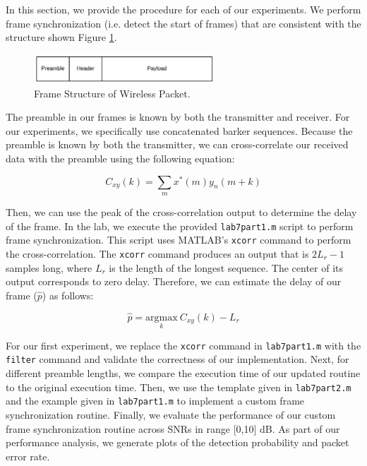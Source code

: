 \documentclass{article}
\begin{document}
In this section, we provide the procedure for each of our experiments. We perform frame synchronization (i.e. detect the start of frames) that are consistent with the structure shown Figure \ref{fig::frame_structure}.

\begin{figure}[H]
	\centerline{\includegraphics[width=0.6\textwidth]{frame_structure.png}}
	\caption{Frame Structure of Wireless Packet.}
	\label{fig::frame_structure}
\end{figure}

\noindent The preamble in our frames is known by both the transmitter and receiver. For our experiments, we specifically use concatenated barker sequences. Because the preamble is known by both the transmitter, we can cross-correlate our received data with the preamble using the following equation:

\begin{equation}
	C_{xy}(k) = \sum_{m}{x^*(m)y_n(m+k)}
\end{equation}

\noindent Then, we can use the peak of the cross-correlation output to determine the delay of the frame. In the lab, we execute the provided \texttt{lab7part1.m} script to perform frame synchronization. This script uses MATLAB's \texttt{xcorr} command to perform the cross-correlation. The \texttt{xcorr} command produces an output that is $2L_r - 1$ samples long, where $L_r$ is the length of the longest sequence. The center of its output corresponds to zero delay. Therefore, we can estimate the delay of our frame ($\hat{p}$) as follows:

\begin{equation}
	\hat{p} = \underset{k}{\text{argmax}}\ C_{xy}(k) - L_r
\end{equation}

\noindent For our first experiment, we replace the \texttt{xcorr} command in \texttt{lab7part1.m} with the \texttt{filter} command and validate the correctness of our implementation. Next, for different preamble lengths, we compare the execution time of our updated routine to the original execution time. Then, we use the template given in \texttt{lab7part2.m} and the example given in \texttt{lab7part1.m} to implement a custom frame synchronization routine. Finally, we evaluate the performance of our custom frame synchronization routine across SNRs in range [0,10] dB. As part of our performance analysis, we generate plots of the detection probability and packet error rate.
 
\end{document}
